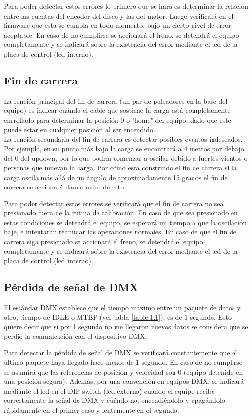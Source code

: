 Para poder detectar estos errores lo primero que se hará es determinar la relación entre las cuentas del encoder del disco y las del motor. Luego verificará en el firmware que esta se cumpla en todo momento, bajo un cierto nivel de error aceptable. En caso de no cumplirse se accionará el freno, se detendrá el equipo completamente y se indicará sobre la existencia del error mediante el led de la placa de control (led interno).

\subsection{Fin de carrera}
La función principal del fin de carrera (un par de pulsadores en la base del equipo) es indicar cuándo el cable que sostiene la carga está completamente enrrollado para determinar la posición 0 o "home" del equipo, dado que este puede estar en cualquier posición al ser encendido.\\
La función secundaria del fin de carrera es detectar posibles eventos indeseados. Por ejemplo, en su punto más bajo la carga se encontrará a 4 metros por debajo del 0 del updown, por lo que podría comenzar a oscilar debido a fuertes vientos o personas que muevan la carga. Por cómo está construido el fin de carrera si la carga oscila más allá de un ángulo de aproximadamente 15 grados el fin de carrera se accionará dando aviso de esto.

Para poder detectar estos errores se verificará que el fin de carrera no sea presionado fuera de la rutina de calibración. En caso de que sea presionado en estas condiciones se detendrá el equipo, se esperará un tiempo a que la oscilación baje, e intentarán reanudar las operaciones normales. En caso de que el fin de carrera siga presionado se accionará el freno, se detendrá el equipo completamente y se indicará sobre la existencia del error mediante el led de la placa de control (led interno).


\subsection{Pérdida de señal de DMX}
El estándar DMX establece que el tiempo máximo entre un paquete de datos y otro, tiempo de IDLE o MTBP (ver tabla \ref{table:1.1}), es de 1 segundo. Esto quiere decir que si por 1 segundo no me llegaron nuevos datos se considera que se perdió la comunicación con el dispositivo DMX.

Para detectar la pérdida de señal de DMX se verificará constantemente que el último paquete haya llegado hace menos de 1 segundo. En caso de no cumplirse se asumirá que las referencias de posición y velocidad son 0 (equipo detenido en una posición segura). Además, por una convención en equipos DMX, se indicará mediante el led en el DIP-switch (led externo) cuándo el equipo recibe correctamente la señal de DMX y cuándo no, encendiéndolo y apagándolo rápidamente en el primer caso y lentamente en el segundo.


